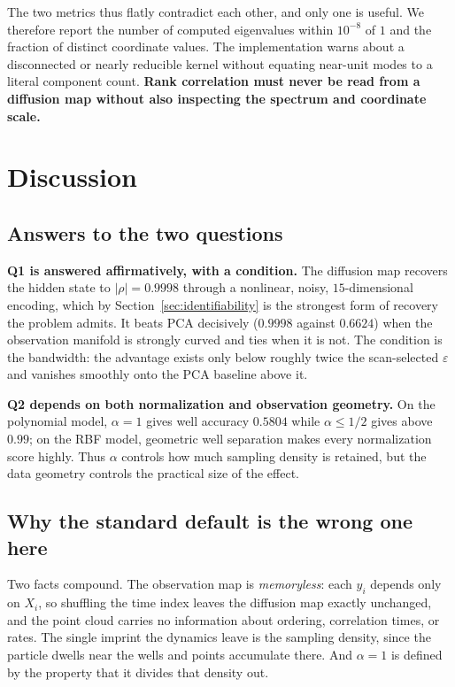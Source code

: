 \documentclass[11pt]{article}
\newcommand{\eps}{\varepsilon}
\begin{document}
The two metrics thus flatly contradict each other, and only one is useful. We
therefore report the number of computed eigenvalues within $10^{-8}$ of $1$ and
the fraction of distinct coordinate values. The implementation warns about a
disconnected or nearly reducible kernel without equating near-unit modes to a
literal component count. \textbf{Rank correlation must never be read from a
diffusion map without also inspecting the spectrum and coordinate scale.}

\section{Discussion}
\label{sec:discussion}

\subsection{Answers to the two questions}

\textbf{Q1 is answered affirmatively, with a condition.} The diffusion map
recovers the hidden state to $\lvert\rho\rvert = 0.9998$ through a nonlinear,
noisy, $15$-dimensional encoding, which by Section~\ref{sec:identifiability} is
the strongest form of recovery the problem admits. It beats PCA decisively
($0.9998$ against $0.6624$) when the observation manifold is strongly curved and
ties when it is not. The condition is the bandwidth: the advantage exists only
below roughly twice the scan-selected $\eps$ and vanishes smoothly onto the PCA
baseline above it.

\textbf{Q2 depends on both normalization and observation geometry.} On the
polynomial model, $\alpha=1$ gives well accuracy $0.5804$ while $\alpha\le1/2$
gives above $0.99$; on the RBF model, geometric well separation makes every
normalization score highly. Thus $\alpha$ controls how much sampling density is
retained, but the data geometry controls the practical size of the effect.

\subsection{Why the standard default is the wrong one here}
\label{sec:disc-geometry}

Two facts compound. The observation map is \emph{memoryless}: each $y_i$ depends
only on $X_i$, so shuffling the time index leaves the diffusion map exactly
unchanged, and the point cloud carries no information about ordering, correlation
times, or rates. The single imprint the dynamics leave is the sampling density,
since the particle dwells near the wells and points accumulate there. And
$\alpha=1$ is defined by the property that it divides that density out.
\end{document}
